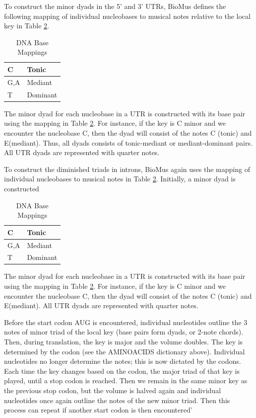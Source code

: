 \documentclass[letterpaper]{article}
\begin{document}
To construct the minor dyads in the 5' and 3' UTRs, BioMus defines the following mapping of individual nucleobases to musical notes relative to the local key in Table  \ref{table:nucleobases}.

\begin{table}[h!]
\centering
\begin{tabular}{|l|l|}
\hline
C   & Tonic    \\ \hline
G,A & Mediant  \\ \hline
T   & Dominant \\ \hline
\end{tabular}
\caption{DNA Base Mappings}
\label{table:nucleobases}
\end{table}

The minor dyad for each nucleobase in a UTR is constructed with its base pair using the mapping in Table  \ref{table:nucleobases}. For instance, if the key is C minor and we encounter the nucleobase C, then the dyad will consist of the notes C (tonic) and E\musFlat (mediant). Thus, all dyads consists of tonic-mediant or mediant-dominant pairs. All UTR dyads are represented with quarter notes. 

To construct the diminished triads in introns, BioMus again uses the mapping of individual nucleobases to musical notes in Table  \ref{table:nucleobases}. Initially, a minor dyad is constructed 

\begin{table}[h!]
\centering
\begin{tabular}{|l|l|}
\hline
C   & Tonic    \\ \hline
G,A & Mediant  \\ \hline
T   & Dominant \\ \hline
\end{tabular}
\caption{DNA Base Mappings}
\label{table:nucleobases}
\end{table}

The minor dyad for each nucleobase in a UTR is constructed with its base pair using the mapping in Table  \ref{table:nucleobases}. For instance, if the key is C minor and we encounter the nucleobase C, then the dyad will consist of the notes C (tonic) and E\musFlat (mediant). All UTR dyads are represented with quarter notes. 

 Before the start codon AUG is encountered, individual nucleotides outline the 3 notes of minor triad of the local key (base pairs form dyads, or 2-note chords). Then, during translation, the key is major and the volume doubles. The
        key is determined by the codon (see the AMINOACIDS dictionary above). Individual nucleotides no longer determine the notes; this is now dictated
        by the codons. Each time the key changes based on the codon, the major triad of that key is played, until a stop codon is reached. Then we remain in
        the same minor key as the previous stop codon, but the volume is halved again and individual nucleotides once again outline the notes of the new
        minor triad. Then this process can repeat if another start codon is then encountered'
\end{document}
